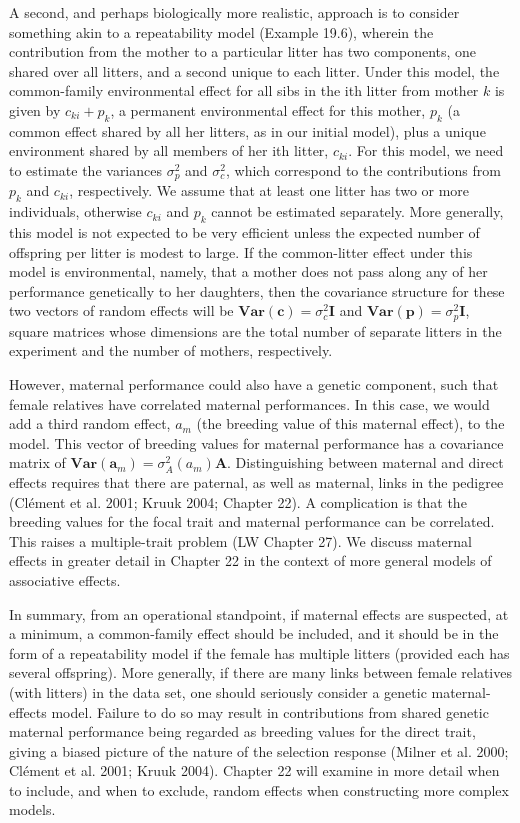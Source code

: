 \documentclass{article}
\begin{document}
A second, and perhaps biologically more realistic, approach is to consider something akin to a repeatability model (Example 19.6), wherein the contribution from the mother to a particular litter has two components, one shared over all litters, and a second unique to each litter. Under this model, the common-family environmental effect for all sibs in the ith litter from mother $k$ is given by $c_{ki} + p_k$, a permanent environmental effect for this mother, $p_k$ (a common effect shared by all her litters, as in our initial model), plus a unique environment shared by all members of her ith litter, $c_{ki}$. For this model, we need to estimate the variances $\sigma_p^2$ and $\sigma_c^2$, which correspond to the contributions from $p_k$ and $c_{ki}$, respectively. We assume that at least one litter has two or more individuals, otherwise $c_{ki}$ and $p_k$ cannot be estimated separately. More generally, this model is not expected to be very efficient unless the expected number of offspring per litter is modest to large. If the common-litter effect under this model is environmental, namely, that a mother does not pass along any of her performance genetically to her daughters, then the covariance structure for these two vectors of random effects will be $\mathbf{Var}(\mathbf{c}) = \sigma_c^2 \mathbf{I}$ and $\mathbf{Var}(\mathbf{p}) = \sigma_p^2 \mathbf{I}$, square matrices whose dimensions are the total number of separate litters in the experiment and the number of mothers, respectively.

However, maternal performance could also have a genetic component, such that female relatives have correlated maternal performances. In this case, we would add a third random effect,  $ a_m $ (the breeding value of this maternal effect), to the model. This vector of breeding values for maternal performance has a covariance matrix of  $ \mathbf{Var}(\mathbf{a}_m) = \sigma_A^2(a_m) \mathbf{A} $. Distinguishing between maternal and direct effects requires that there are paternal, as well as maternal, links in the pedigree (Clément et al. 2001; Kruuk 2004; Chapter 22). A complication is that the breeding values for the focal trait and maternal performance can be correlated. This raises a multiple-trait problem (LW Chapter 27). We discuss maternal effects in greater detail in Chapter 22 in the context of more general models of associative effects.

In summary, from an operational standpoint, if maternal effects are suspected, at a minimum, a common-family effect should be included, and it should be in the form of a repeatability model if the female has multiple litters (provided each has several offspring). More generally, if there are many links between female relatives (with litters) in the data set, one should seriously consider a genetic maternal-effects model. Failure to do so may result in contributions from shared genetic maternal performance being regarded as breeding values for the direct trait, giving a biased picture of the nature of the selection response (Milner et al. 2000; Clément et al. 2001; Kruuk 2004). Chapter 22 will examine in more detail when to include, and when to exclude, random effects when constructing more complex models.
\end{document}
